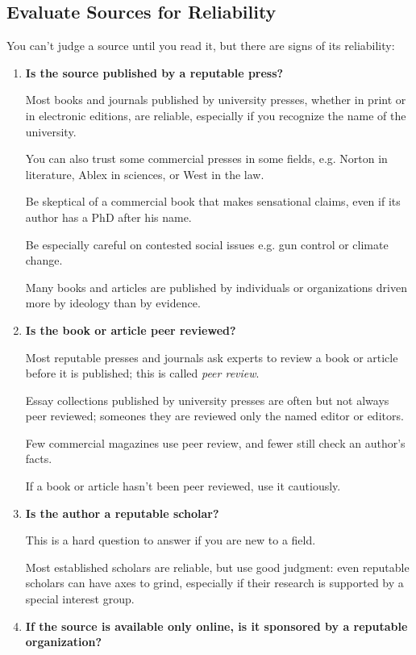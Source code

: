 \documentclass[oneside]{book}
\numberwithin{equation}{section}
\begin{document}
\subsection{Evaluate Sources for Reliability}
You can't judge a source until you read it, but there are signs of its reliability:
\begin{enumerate}
    \item \textbf{Is the source published by a reputable press?}
    
    Most books and journals published by university presses, whether in print or in electronic editions, are reliable, especially if you recognize the name of the university.
    
    You can also trust some commercial presses in some fields, e.g. Norton in literature, Ablex in sciences, or West in the law.
    
    Be skeptical of a commercial book that makes sensational claims, even if its author has a PhD after his name.
    
    Be especially careful on contested social issues e.g. gun control or climate change.
    
    Many books and articles are published by individuals or organizations driven more by ideology than by evidence.
    \item \textbf{Is the book or article peer reviewed?}
    
    Most reputable presses and journals ask experts to review a book or article before it is published; this is called \textit{peer review}.
    
    Essay collections published by university presses are often but not always peer reviewed; someones they are reviewed only the named editor or editors.
    
    Few commercial magazines use peer review, and fewer still check an author's facts.
    
    If a book or article hasn't been peer reviewed, use it cautiously.
    \item \textbf{Is the author a reputable scholar?}
    
    This is a hard question to answer if you are new to a field.
    
    Most established scholars are reliable, but use good judgment: even reputable scholars can have axes to grind, especially if their research is supported by a special interest group.
    \item \textbf{If the source is available only online, is it sponsored by a reputable organization?}
    

\end{enumerate}
\end{document}
